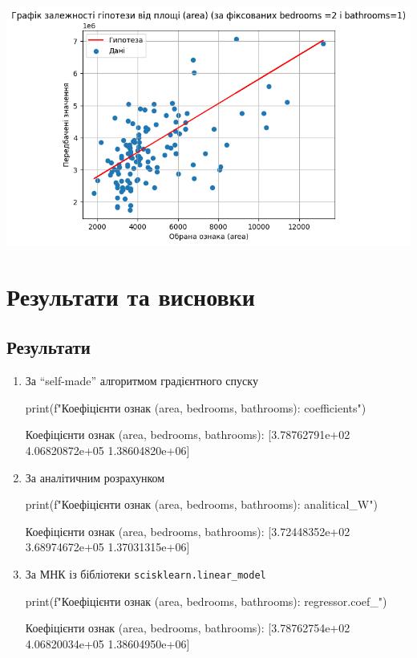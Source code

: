 \documentclass[]{article}
\newcounter{pythoncode}
\begin{document}
\begin{center}
	\includegraphics[width=\linewidth]{hw3_files/hw3_28_0.png}
\end{center}

\section*{Результати та висновки}

\subsection{Результати}

\begin{enumerate}
	\item За ``self-made'' алгоритмом градієнтного спуску

\begin{pythoncode}
print(f"Коефіцієнти ознак (area, bedrooms, bathrooms): {coefficients}")
\end{pythoncode}

\begin{out}
Коефіцієнти ознак (area, bedrooms, bathrooms): [3.78762791e+02 4.06820872e+05
1.38604820e+06]
\end{out}

\item За аналітичним розрахунком


\begin{pythoncode}
print(f"Коефіцієнти ознак (area, bedrooms, bathrooms): {analitical_W}")
\end{pythoncode}

\begin{out}
	Коефіцієнти ознак (area, bedrooms, bathrooms): [3.72448352e+02 3.68974672e+05
	1.37031315e+06]
\end{out}

\item За МНК із бібліотеки \texttt{scisklearn.linear\_model}

\begin{pythoncode}
print(f"Коефіцієнти ознак (area, bedrooms, bathrooms): {regressor.coef_}")
\end{pythoncode}

\begin{out}
Коефіцієнти ознак (area, bedrooms, bathrooms): [3.78762754e+02 4.06820034e+05
1.38604950e+06]
\end{out}

\end{enumerate}
\end{document}
